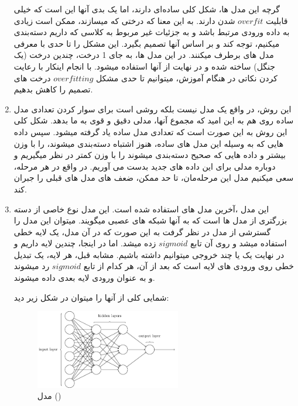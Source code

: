 \begin{enumerate}
	گرچه این مدل ها، شکل کلی ساده‌ای دارند، اما یک بدی آنها این است که خیلی قابلیت $overfit$ شدن دارند. به این معنا که درختی که میسازند، ممکن است زیادی به داده ورودی مرتبط باشد و به جزئیات غیر مربوط به کلاسی که داریم دسته‌بندی میکنیم، توجه کند و بر اساس آنها تصمیم بگیرد. این مشکل را تا حدی با معرفی مدل های 
	برطرف میکنند. در این مدل ها، به جای 1 درخت، چندین درخت (یک جنگل) ساخته شده و در نهایت از آنها استفاده میشود. با انجام اینکار با رعایت کردن نکاتی در هنگام آموزش، میتوانیم تا حدی مشکل $overfitting$ درخت های تصمیم را کاهش بدهیم.
	
	\item 
	
	این روش، در واقع یک مدل نیست بلکه روشی است برای سوار کردن تعدادی مدل ساده روی هم به این امید که مجموع آنها، مدلی دقیق و قوی به ما بدهد. شکل کلی این روش به این صورت است که تعدادی مدل ساده یاد گرفته میشود. سپس داده هایی که به وسیله این مدل های ساده، هنوز اشتباه دسته‌بندی میشوند، را با وزن بیشتر و داده هایی که صحیح دسته‌بندی میشوند را با وزن کمتر در نظر میگیریم و دوباره مدلی برای این داده های جدید بدست می آوریم. در واقع در هر مرحله، سعی میکنیم مدل این مرحله‌مان، تا حد ممکن، ضعف های مدل های قبلی را جبران کند. 
	
	\item 
	
	این مدل ،آخرین مدل های استفاده شده است. این مدل نوع خاصی از دسته بزرگتری از مدل ها است که به آنها شبکه های عصبی میگویند. میتوان این مدل را گسترشی از مدل  در نظر گرفت به این صورت که در آن مدل، یک لایه خطی استفاده میشد و روی آن تابع $sigmoid$ زده میشد. اما در اینجا، چندین لایه داریم و در نهایت یک یا چند خروجی میتوانیم داشته باشیم. مشابه قبل، هر لایه، یک تبدیل خطی روی ورودی های لایه است که بعد از آن، هر کدام از تابع $sigmoid$ رد میشوند و به عنوان ورودی لایه بعدی داده میشوند. 
	
	شمایی  کلی از آنها را میتوان در شکل زیر دید:
	\begin{figure}[h]
		\centering
		\includegraphics[width=0.6\textwidth]{training/5}
		\caption{مدل ()}
		\label{fig:training:mlp}
	\end{figure} \pagebreak

\end{enumerate}


